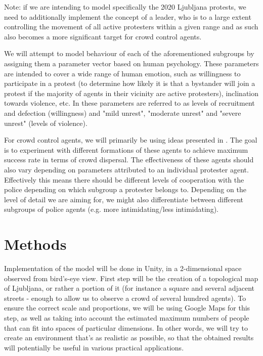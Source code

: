 \documentclass[9pt]{pnas-new}
\begin{document}
\bigskip
Note: if we are intending to model specifically the 2020 Ljubljana protests, we need to additionally implement the concept of a leader, who is to a large extent controlling the movement of all active protesters within a given range and as such also becomes a more significant target for crowd control agents. 

\bigskip
We will attempt to model behaviour of each of the aforementioned subgroups by assigning them a parameter vector based on human psychology. These parameters are intended to cover a wide range of human emotion, such as willingness to participate in a protest (to determine how likely it is that a bystander will join a protest if the majority of agents in their vicinity are active protesters), inclination towards violence, etc. In \cite{sportsriots} these parameters are referred to as levels of recruitment and defection (willingness) and "mild unrest", "moderate unrest" and "severe unrest" (levels of violence). 


\bigskip
For crowd control agents, we will primarily be using ideas presented in \cite{crowdcontrol2}. The goal is to experiment with different formations of these agents to achieve maximum success rate in terms of crowd dispersal. The effectiveness of these agents should also vary depending on parameters attributed to an individual protester agent. Effectively this means there should be different levels of cooperation with the police depending on which subgroup a protester belongs to. Depending on the level of detail we are aiming for, we might also differentiate between different subgroups of police agents (e.g. more intimidating/less intimidating). 

\section*{Methods}

Implementation of the model will be done in Unity, in a 2-dimensional space observed from bird's-eye view. First step will be the creation of a topological map of Ljubljana, or rather a portion of it (for instance a square and several adjacent streets - enough to allow us to observe a crowd of several hundred agents). To ensure the correct scale and proportions, we will be using Google Maps for this step, as well as taking into account the estimated maximum numbers of people that can fit into spaces of particular dimensions. In other words, we will try to create an environment that's as realistic as possible, so that the obtained results will potentially be useful in various practical applications. 
\end{document}
